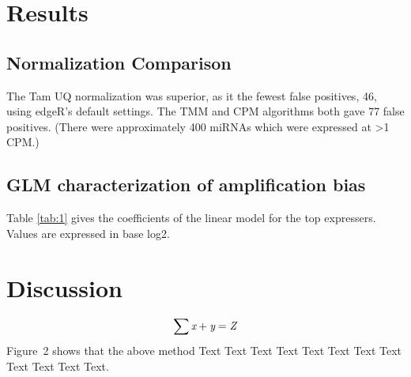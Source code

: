 \documentclass{bioinfo}
\begin{document}
\section{Results}
\subsection{Normalization Comparison}
The Tam UQ normalization was superior, as it the fewest false positives, 46, using edgeR's default settings. The TMM and CPM algorithms both gave 77 false positives. (There were approximately 400 miRNAs which were expressed at >1 CPM.) 

\subsection{GLM characterization of amplification bias}
Table \ref{tab:1} gives the coefficients of the linear model for the top expressers. Values are expressed in base log2.


\section{Discussion}







\begin{equation}
\sum \text{\it x}+ \text{\it y} =\text{\it Z}\label{eq:01}\vspace*{-10pt}
\end{equation}
Figure~2\vphantom{\ref{fig:02}} shows that the above method  Text
Text Text Text  Text Text Text Text Text Text  Text Text.
\end{document}
